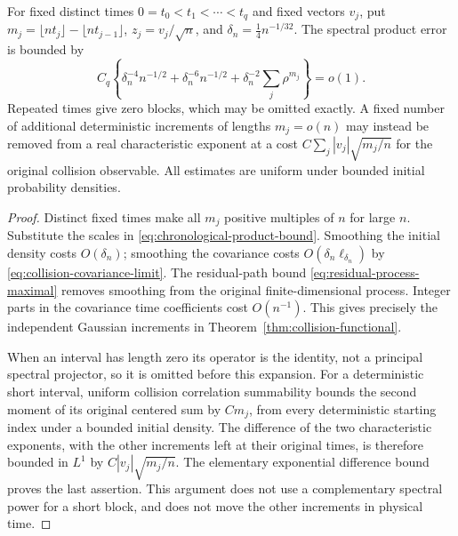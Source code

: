 \begin{corollary}
\label{cor:finite-dimensional-details}
For fixed distinct times $0=t_0<t_1<\cdots<t_q$ and fixed vectors
$v_j$, put
$m_j=\lfloor nt_j\rfloor-\lfloor nt_{j-1}\rfloor$,
$z_j=v_j/\sqrt n$, and $\delta_n=\tfrac14n^{-1/32}$.
The spectral product error is bounded by
\[
 C_q\left\{\delta_n^{-4}n^{-1/2}
             +\delta_n^{-6}n^{-1/2}
             +\delta_n^{-2}\sum_j\rho^{m_j}\right\}=o(1).
\]
Repeated times give zero blocks, which may be omitted exactly. A fixed
number of additional deterministic increments of lengths $m_j=o(n)$
may instead be removed from a real characteristic exponent at a cost
$C\sum_j |v_j|\sqrt{m_j/n}$ for the original collision observable.
All estimates are uniform under bounded initial probability densities.
\end{corollary}
\begin{proof}
Distinct fixed times make all $m_j$ positive multiples of $n$ for
large $n$. Substitute the scales in
\eqref{eq:chronological-product-bound}. Smoothing the initial density
costs $O(\delta_n)$; smoothing the covariance costs
$O(\delta_n\ell_{\delta_n})$ by
\eqref{eq:collision-covariance-limit}. The residual-path bound
\eqref{eq:residual-process-maximal} removes smoothing from the original
finite-dimensional process. Integer parts in the covariance time
coefficients cost $O(n^{-1})$. This gives precisely the independent
Gaussian increments in Theorem~\ref{thm:collision-functional}.

When an interval has length zero its operator is the identity, not a
principal spectral projector, so it is omitted before this expansion.
For a deterministic short interval, uniform collision correlation
summability bounds the second moment of its original centered sum by
$Cm_j$, from every deterministic starting index under a bounded
initial density. The difference of the two characteristic exponents,
with the other increments left at their original times, is therefore
bounded in $L^1$ by $C|v_j|\sqrt{m_j/n}$. The elementary exponential
difference bound proves the last assertion. This argument does not
use a complementary spectral power for a short block, and does not
move the other increments in physical time.
\end{proof}

